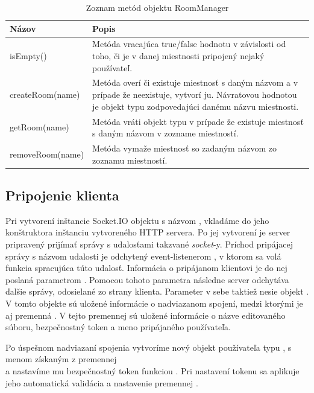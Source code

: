\begin{table}
	\begin{tabular}{ | m{4cm} | m{8.5cm} | } \hline
		\textbf{Názov} & \textbf{Popis} \\ \hline \hline
		
		isEmpty() & Metóda vracajúca true/false hodnotu v závislosti od toho, či je v danej miestnosti pripojený nejaký používateľ. \\\hline
		createRoom(name) & Metóda overí či existuje miestnosť s daným názvom a v prípade že neexistuje, vytvorí ju. Návratovou hodnotou je objekt typu \code{Room} zodpovedajúci danému názvu miestnosti. \\\hline
		getRoom(name) & Metóda vráti objekt typu \code{Room} v prípade že existuje miestnosť s daným názvom v zozname miestností. \\\hline
		removeRoom(name) & Metóda vymaže miestnosť so zadaným názvom zo zoznamu miestností. \\\hline
		
		\hline
	\end{tabular}
	\caption{Zoznam metód objektu RoomManager}
	\label{tab:server-func-roommanager}
\end{table}
\FloatBarrier

\subsection{Pripojenie klienta}

Pri vytvorení inštancie Socket.IO objektu s názvom , vkladáme do jeho konštruktora inštanciu vytvoreného HTTP servera. Po jej vytvorení je server pripravený prijímať správy s udalosťami takzvané \textit{socket}-y. Príchod pripájacej správy s názvom udalosti   je odchytený event-listenerom  , v ktorom sa volá funkcia spracujúca túto udalosť. Informácia o pripájanom klientovi je do nej poslaná parametrom . Pomocou tohoto parametra následne server odchytáva ďalšie správy, odosielané zo strany klienta. Parameter v sebe taktiež nesie objekt . V tomto objekte sú uložené informácie o nadviazanom spojení, medzi ktorými je aj premenná . V tejto premennej sú uložené informácie o názve editovaného súboru, bezpečnostný token a meno pripájaného používateľa. 

Po úspešnom nadviazaní spojenia vytvoríme nový objekt používateľa typu , s menom získaným z premennej\\
  a nastavíme mu bezpečnostný token funkciou . Pri nastavení tokenu sa aplikuje jeho automatická validácia a nastavenie premennej .


